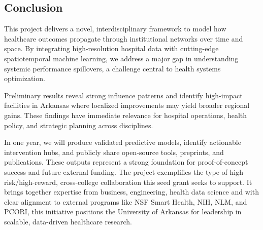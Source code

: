 \documentclass[10pt]{article}
\begin{document}
\subsection*{Conclusion}

This project delivers a novel, interdisciplinary framework to model how healthcare outcomes propagate through institutional networks over time and space. By integrating high-resolution hospital data with cutting-edge spatiotemporal machine learning, we address a major gap in understanding systemic performance spillovers, a challenge central to health systems optimization.

Preliminary results reveal strong influence patterns and identify high-impact facilities in Arkansas where localized improvements may yield broader regional gains. These findings have immediate relevance for hospital operations, health policy, and strategic planning across disciplines.

In one year, we will produce validated predictive models, identify actionable intervention hubs, and publicly share open-source tools, preprints, and publications. These outputs represent a strong foundation for proof-of-concept success and future external funding.
The project exemplifies the type of high-risk/high-reward, cross-college collaboration this seed grant seeks to support. It brings together expertise from business, engineering, health data science and with clear alignment to external programs like NSF Smart Health, NIH, NLM, and PCORI, this initiative positions the University of Arkansas for leadership in scalable, data-driven healthcare research.

\newpage








\end{document}
